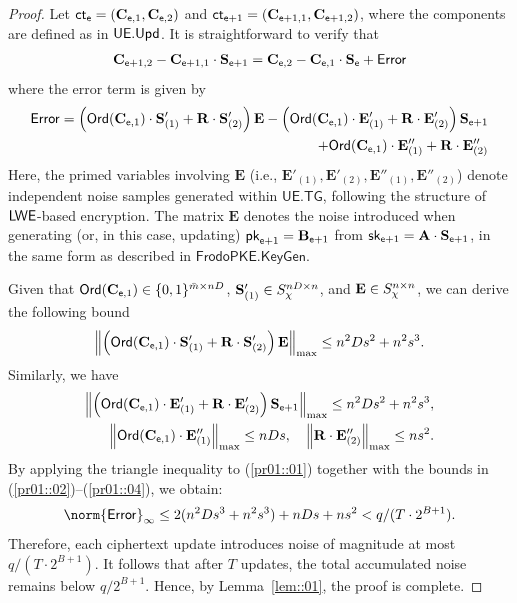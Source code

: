 \documentclass{fundam}
\begin{document}
\begin{proof}
Let $\mathsf{ct}_{\mathsf{e}} =  (\mathbf{C}_{\mathsf{e},1}, \mathbf{C}_{\mathsf{e}, 2})$ and $\mathsf{ct}_{\mathsf{e}+1} =  (\mathbf{C}_{\mathsf{e}+1,1}, \mathbf{C}_{\mathsf{e}+1, 2})$, where the components are defined as in $\mathsf{UE.Upd}$. It is straightforward to verify that 
 \begin{align*}
	\mathbf{C}_{\mathsf{e}+1,2} - \mathbf{C}_{\mathsf{e} +1, 1}\cdot \mathbf{S}_{\mathsf{e} +1} = \mathbf{C}_{\mathsf{e},2} - \mathbf{C}_{\mathsf{e} , 1}\cdot \mathbf{S}_{\mathsf{e} } + \mathsf{Error}
\end{align*}
where the error term is given by
\begin{align}\label{pr01::01}
	\mathsf{Error}= \left(\mathsf{Ord}(\mathbf{C}_{\mathsf{e} , 1})\cdot\mathbf{S}_{(1)}' + \mathbf{R}\cdot \mathbf{S}_{(2)}'\right)\mathbf{E}- \left(\mathsf{Ord}(\mathbf{C}_{\mathsf{e} , 1})\cdot\mathbf{E}_{(1)}' + \mathbf{R}\cdot \mathbf{E}_{(2)}'\right)\mathbf{S}_{\mathsf{e}+1} \\
	+ \mathsf{Ord}(\mathbf{C}_{\mathsf{e} , 1})\cdot\mathbf{E}_{(1)}'' + \mathbf{R}\cdot \mathbf{E}_{(2)}'' \nonumber
\end{align}
Here, the primed variables involving $\mathbf{E}$ (i.e., $\mathbf{E}'_{(1)}, \mathbf{E}'_{(2)}, \mathbf{E}''_{(1)}, \mathbf{E}''_{(2)}$) denote independent noise samples generated within $\mathsf{UE.TG}$, following the structure of $\mathsf{LWE}$-based encryption. The matrix $\mathbf{E}$ denotes the noise introduced when generating (or, in this case, updating) $\mathsf{pk}_{\mathsf{e}+1} = \mathbf{B}_{\mathsf{e}+1}$ from $\mathsf{sk}_{\mathsf{e}+1} = \mathbf{A} \cdot \mathbf{S}_{\mathsf{e}+1}$, in the same form as described in $\mathsf{FrodoPKE.KeyGen}$.
%

\noindent Given that $\mathsf{Ord}(\mathbf{C}_{\mathsf{e} , 1})\in\{0,1\}^{\bar{m}\times nD}$, $\mathbf{S}_{(1)}' \in S_{\chi}^{nD\times n}$, and $\mathbf{E} \in S_{\chi}^{n\times n}$, we can derive the following bound
\begin{align}\label{pr01::02}
	\left\|  \left(\mathsf{Ord}(\mathbf{C}_{\mathsf{e} , 1})\cdot\mathbf{S}_{(1)}' + \mathbf{R}\cdot \mathbf{S}_{(2)}'\right)\mathbf{E} \right\|_{\max}\leq n^{2}Ds^{2}+n^{2}s^{3}.
\end{align}
Similarly, we have
\begin{align}
	\left\|  \left(\mathsf{Ord}(\mathbf{C}_{\mathsf{e} , 1})\cdot\mathbf{E}_{(1)}' + \mathbf{R}\cdot \mathbf{E}_{(2)}'\right)\mathbf{S}_{\mathsf{e}+1}    \right\|_{\max}\leq n^{2}Ds^{2}+n^{2}s^{3}, \label{pr01::03}\\
		\left\|  \mathsf{Ord}(\mathbf{C}_{\mathsf{e} , 1})\cdot\mathbf{E}_{(1)}'' \right\|_{\max}\leq nDs, ~~~ \left\|  \mathbf{R}\cdot \mathbf{E}_{(2)}'' \right\|_{\max}\leq ns^{2}. \label{pr01::04}
\end{align}
By applying the triangle inequality to (\ref{pr01::01}) together with the bounds in (\ref{pr01::02})–(\ref{pr01::04}), we obtain:
\begin{align*}
	\norm{\tx{Error}}_{\infty}\leq 2(n^{2}Ds^{3}+n^{2}s^{3})+nDs + ns^{2}<q/(T\cdot 2^{B+1}).
\end{align*}
Therefore, each ciphertext update introduces noise of magnitude at most $q / (T \cdot 2^{B+1})$. It follows that after $T$ updates, the total accumulated noise remains below $q / 2^{B+1}$. Hence, by Lemma~\ref{lem::01}, the proof is complete.
\end{proof}	
\end{document}
